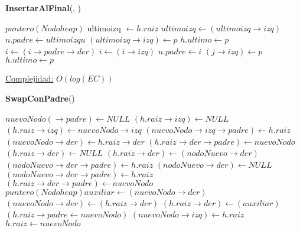 \begin{Algoritmos}
\begin{algorithm}[H]{\textbf{InsertarAlFinal}(, )}
\begin{algorithmic}[1]
    					\EndWhile
    						\State $puntero(Nodoheap)$ ultimoizq $\gets h.raiz$
    							\State $ultimoizq \gets (ultimoizq \rightarrow izq)$
    						\EndWhile
    						\State $n.padre \gets ultimoizqu$
    						\State $(ultimoizq \rightarrow izq) \gets p$
    						\State $h.ultimo \gets p$
    					\Else
    						\State $i \gets (i \rightarrow padre \rightarrow der)$
    							\State $i \gets (i \rightarrow izq)$
    						\EndWhile
    						\State $n.padre \gets i$
    						\State $(j \rightarrow izq) \gets p$
    						\State $h.ultimo \gets p$
    					\EndIf
    				\EndIf		
    			\EndIf	    	
	    	\EndIf
		\EndIf

			\medskip
			\Statex \underline{Complejidad:} $O(log(EC))$
    	\end{algorithmic}   	
\end{algorithm}





\begin{algorithm}[H]{\textbf{SwapConPadre}()}
    	\begin{algorithmic}[1]
						\State $nuevoNodo (\rightarrow padre) \gets NULL$
								\State $(h.raiz \rightarrow izq) \gets NULL$
							\Else
								\State $(h.raiz \rightarrow izq) \gets nuevoNodo \rightarrow izq$
								\State $(nuevoNodo \rightarrow izq \rightarrow padre) \gets h.raiz$
							\EndIf
								\State $(nuevoNodo \rightarrow der) \gets h.raiz \rightarrow der$
									\State $(h.raiz \rightarrow der \rightarrow padre) \gets nuevoNodo$							
								\EndIf
								\State $(h.raiz \rightarrow der) \gets NULL$
							\Else
									\State $(h.raiz \rightarrow der) \gets (nodoNuevo \rightarrow der)$
									\State $(nodoNuevo \rightarrow der \rightarrow padre) \gets h.raiz$
									\State $(nodoNuevo \rightarrow der) \gets NULL$
								\Else
									\State $(nodoNuevo \rightarrow der \rightarrow padre) \gets h.raiz$
									\State $(h.raiz \rightarrow der \rightarrow padre) \gets nuevoNodo$
									\State $puntero(Nodoheap) auxiliar \gets (nuevoNodo \rightarrow der)$
									\State $(nuevoNodo \rightarrow der) \gets (h.raiz \rightarrow der)$
									\State $(h.raiz \rightarrow der) \gets (auxiliar)$
								\EndIf
							\EndIf
						\State $(h.raiz \rightarrow padre \gets nuevoNodo)$
						\State $(nuevoNodo \rightarrow izq) \gets h.raiz$
						\State $h.raiz \gets nuevoNodo$						
						

\end{algorithmic}
\end{algorithm}
\end{Algoritmos}
